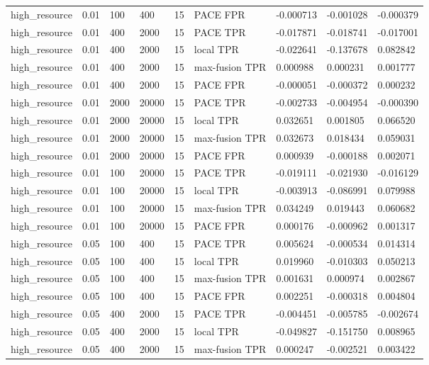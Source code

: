 \begin{tabular}{lllllllll}
high\_resource & 0.01 & 100 & 400 & 15 & PACE FPR & -0.000713 & -0.001028 & -0.000379 \\
high\_resource & 0.01 & 400 & 2000 & 15 & PACE TPR & -0.017871 & -0.018741 & -0.017001 \\
high\_resource & 0.01 & 400 & 2000 & 15 & local TPR & -0.022641 & -0.137678 & 0.082842 \\
high\_resource & 0.01 & 400 & 2000 & 15 & max-fusion TPR & 0.000988 & 0.000231 & 0.001777 \\
high\_resource & 0.01 & 400 & 2000 & 15 & PACE FPR & -0.000051 & -0.000372 & 0.000232 \\
high\_resource & 0.01 & 2000 & 20000 & 15 & PACE TPR & -0.002733 & -0.004954 & -0.000390 \\
high\_resource & 0.01 & 2000 & 20000 & 15 & local TPR & 0.032651 & 0.001805 & 0.066520 \\
high\_resource & 0.01 & 2000 & 20000 & 15 & max-fusion TPR & 0.032673 & 0.018434 & 0.059031 \\
high\_resource & 0.01 & 2000 & 20000 & 15 & PACE FPR & 0.000939 & -0.000188 & 0.002071 \\
high\_resource & 0.01 & 100 & 20000 & 15 & PACE TPR & -0.019111 & -0.021930 & -0.016129 \\
high\_resource & 0.01 & 100 & 20000 & 15 & local TPR & -0.003913 & -0.086991 & 0.079988 \\
high\_resource & 0.01 & 100 & 20000 & 15 & max-fusion TPR & 0.034249 & 0.019443 & 0.060682 \\
high\_resource & 0.01 & 100 & 20000 & 15 & PACE FPR & 0.000176 & -0.000962 & 0.001317 \\
high\_resource & 0.05 & 100 & 400 & 15 & PACE TPR & 0.005624 & -0.000534 & 0.014314 \\
high\_resource & 0.05 & 100 & 400 & 15 & local TPR & 0.019960 & -0.010303 & 0.050213 \\
high\_resource & 0.05 & 100 & 400 & 15 & max-fusion TPR & 0.001631 & 0.000974 & 0.002867 \\
high\_resource & 0.05 & 100 & 400 & 15 & PACE FPR & 0.002251 & -0.000318 & 0.004804 \\
high\_resource & 0.05 & 400 & 2000 & 15 & PACE TPR & -0.004451 & -0.005785 & -0.002674 \\
high\_resource & 0.05 & 400 & 2000 & 15 & local TPR & -0.049827 & -0.151750 & 0.008965 \\
high\_resource & 0.05 & 400 & 2000 & 15 & max-fusion TPR & 0.000247 & -0.002521 & 0.003422 \\

\end{tabular}
